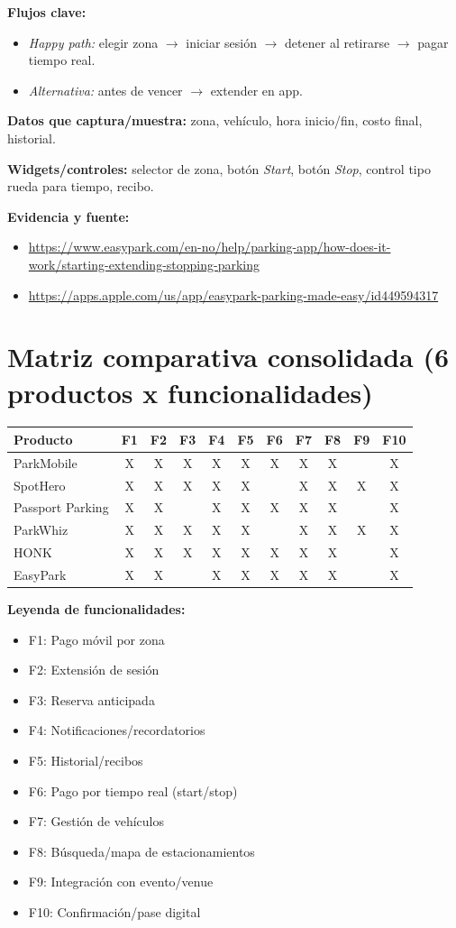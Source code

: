 \documentclass[11pt]{article}
\begin{document}
\textbf{Flujos clave:}
\begin{itemize}
\item \textit{Happy path:} elegir zona $\rightarrow$ iniciar sesión $\rightarrow$ detener al retirarse $\rightarrow$ pagar tiempo real.
\item \textit{Alternativa:} antes de vencer $\rightarrow$ extender en app.
\end{itemize}

\textbf{Datos que captura/muestra:} zona, vehículo, hora inicio/fin, costo final, historial.

\textbf{Widgets/controles:} selector de zona, botón \textit{Start}, botón \textit{Stop}, control tipo rueda para tiempo, recibo.

\textbf{Evidencia y fuente:}
\begin{itemize}
\item \url{https://www.easypark.com/en-no/help/parking-app/how-does-it-work/starting-extending-stopping-parking}
\item \url{https://apps.apple.com/us/app/easypark-parking-made-easy/id449594317}
\end{itemize}

\section{Matriz comparativa consolidada (6 productos x funcionalidades)}
\small
\begin{longtable}{p{3.4cm}cccccccccc}
\toprule
\textbf{Producto} & F1 & F2 & F3 & F4 & F5 & F6 & F7 & F8 & F9 & F10 \\
\midrule
\endhead
ParkMobile & X & X & X & X & X & X & X & X &  & X \\
SpotHero & X & X & X & X & X &  & X & X & X & X \\
Passport Parking & X & X &  & X & X & X & X & X &  & X \\
ParkWhiz & X & X & X & X & X &  & X & X & X & X \\
HONK & X & X & X & X & X & X & X & X &  & X \\
EasyPark & X & X &  & X & X & X & X & X &  & X \\
\bottomrule
\end{longtable}
\normalsize

\textbf{Leyenda de funcionalidades:}
\begin{itemize}
\item F1: Pago móvil por zona
\item F2: Extensión de sesión
\item F3: Reserva anticipada
\item F4: Notificaciones/recordatorios
\item F5: Historial/recibos
\item F6: Pago por tiempo real (start/stop)
\item F7: Gestión de vehículos
\item F8: Búsqueda/mapa de estacionamientos
\item F9: Integración con evento/venue
\item F10: Confirmación/pase digital
\end{itemize}
\end{document}
